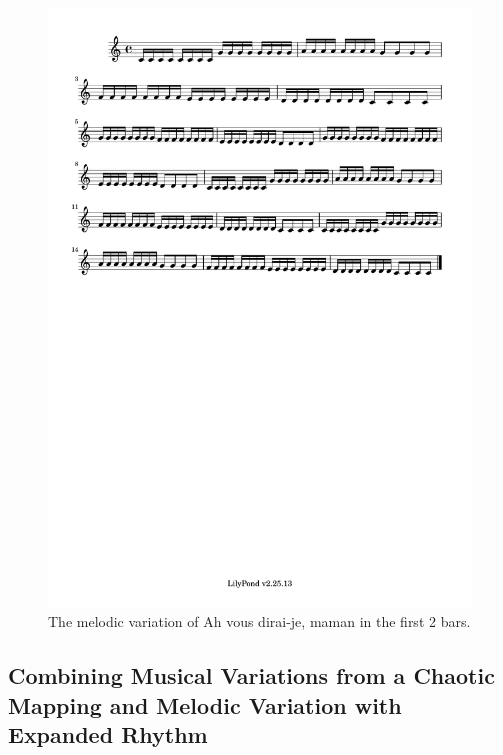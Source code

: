 \documentclass[11pt]{article}
\theoremstyle{definition}
\begin{document}
\begin{figure}
\centering
\includegraphics[trim=1cm 26.5cm 1cm 0.5cm, clip, scale=0.6]{melody_variation.pdf}
\caption{The melodic variation of Ah vous dirai-je, maman in the first 2 bars.}
\label{fig:MV2}
\end{figure}

\subsection{Combining Musical Variations from a Chaotic Mapping and Melodic Variation with Expanded Rhythm}
\end{document}
